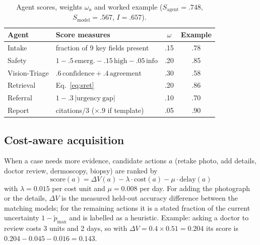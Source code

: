 \documentclass[conference]{IEEEtran}
\begin{document}
\begin{table}[!t]
\caption{Agent scores, weights $\omega_a$ and worked example ($S_{\mathrm{agent}}=.748$, $S_{\mathrm{model}}=.567$, $I=.657$).}
\label{tab:agents}
\centering\footnotesize
\begin{tabular}{llcc}
\toprule
Agent & Score measures & $\omega$ & Example \\
\midrule
Intake & fraction of 9 key fields present & .15 & .78 \\
Safety & $1-.5\,\mathrm{emerg.}-.15\,\mathrm{high}-.05\,\mathrm{info}$ & .20 & .85 \\
Vision-Triage & $.6\,\mathrm{confidence}+.4\,\mathrm{agreement}$ & .30 & .58 \\
Retrieval & Eq.~\eqref{eq:sret} & .20 & .86 \\
Referral & $1-.3\,|\mathrm{urgency\ gap}|$ & .10 & .70 \\
Report & citations$/3$ ($\times .9$ if template) & .05 & .90 \\
\bottomrule
\end{tabular}
\end{table}


\subsection{Cost-aware acquisition}
When a case needs more evidence, candidate actions $a$ (retake photo, add details, doctor review, dermoscopy, biopsy) are ranked by
\begin{equation}
\mathrm{score}(a)=\Delta V(a)-\lambda\cdot\mathrm{cost}(a)-\mu\cdot\mathrm{delay}(a)
\label{eq:acq}
\end{equation}
with $\lambda=0.015$ per cost unit and $\mu=0.008$ per day. For adding the photograph or the details, $\Delta V$ is the measured held-out accuracy difference between the matching models; for the remaining actions it is a stated fraction of the current uncertainty $1-\tilde p_{\max}$ and is labelled as a heuristic. Example: asking a doctor to review costs 3 units and 2 days, so with $\Delta V=0.4\times0.51=0.204$ its score is $0.204-0.045-0.016=0.143$.
\end{document}
